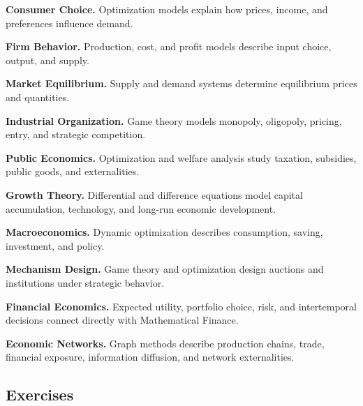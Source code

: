 \begin{applicationbox}

\textbf{Consumer Choice.}
Optimization models explain how prices, income, and preferences influence
demand.

\medskip

\textbf{Firm Behavior.}
Production, cost, and profit models describe input choice, output, and supply.

\medskip

\textbf{Market Equilibrium.}
Supply and demand systems determine equilibrium prices and quantities.

\medskip

\textbf{Industrial Organization.}
Game theory models monopoly, oligopoly, pricing, entry, and strategic
competition.

\medskip

\textbf{Public Economics.}
Optimization and welfare analysis study taxation, subsidies, public goods,
and externalities.

\medskip

\textbf{Growth Theory.}
Differential and difference equations model capital accumulation, technology,
and long-run economic development.

\medskip

\textbf{Macroeconomics.}
Dynamic optimization describes consumption, saving, investment, and policy.

\medskip

\textbf{Mechanism Design.}
Game theory and optimization design auctions and institutions under strategic
behavior.

\medskip

\textbf{Financial Economics.}
Expected utility, portfolio choice, risk, and intertemporal decisions connect
directly with Mathematical Finance.

\medskip

\textbf{Economic Networks.}
Graph methods describe production chains, trade, financial exposure,
information diffusion, and network externalities.

\end{applicationbox}

\subsection{Exercises}
\label{subsec:mathematical-economics-exercises}

